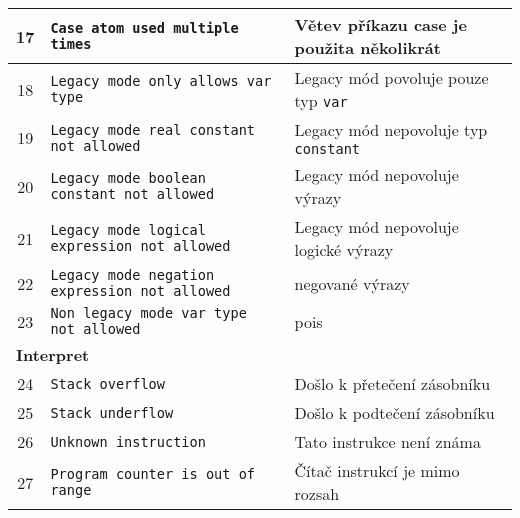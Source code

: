 \documentclass[
12pt,
a4paper,
pdftex,
czech
]{report}
\begin{document}
\begin{longtable}{|c|p{5.5cm}|p{6.5cm}|}
\rule{0pt}{3ex}17 & \texttt{Case atom used multiple times} & Větev příkazu case je použita několikrát \\ \hline
\rule{0pt}{3ex}18 & \texttt{Legacy mode only allows var type} & Legacy mód povoluje pouze typ \texttt{var} \\ \hline
\rule{0pt}{3ex}19 & \texttt{Legacy mode real constant not allowed} & Legacy mód nepovoluje typ \texttt{constant} \\ \hline
\rule{0pt}{3ex}20 & \texttt{Legacy mode boolean constant not allowed} & Legacy mód nepovoluje výrazy \\ \hline
\rule{0pt}{3ex}21 & \texttt{Legacy mode logical expression not allowed} & Legacy mód nepovoluje logické výrazy \\ \hline
\rule{0pt}{3ex}22 & \texttt{Legacy mode negation expression not allowed} & negované výrazy \\ \hline
\rule{0pt}{3ex}23 & \texttt{Non legacy mode var type not allowed} & pois \\ \hline
\multicolumn{3}{|l|}{\textbf{Interpret}}\\ \hline
\rule{0pt}{3ex}24 & \texttt{Stack overflow} & Došlo k přetečení zásobníku \\ \hline
\rule{0pt}{3ex}25 & \texttt{Stack underflow} & Došlo k podtečení zásobníku \\ \hline
\rule{0pt}{3ex}26 & \texttt{Unknown instruction} & Tato instrukce není známa \\ \hline
\rule{0pt}{3ex}27 & \texttt{Program counter is out of range} & Čítač instrukcí je mimo rozsah \\ \hline
\end{longtable}
\end{document}
